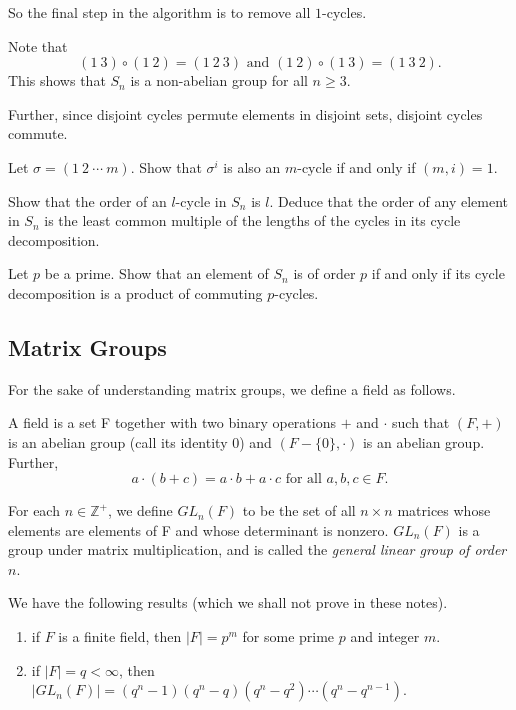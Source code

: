 So the final step in the algorithm is to remove all $1$-cycles.

\vspace{3mm}
Note that
$$(1\:3)\circ(1\:2)=(1\:2\:3)\text{ and }(1\:2)\circ(1\:3)=(1\:3\:2).$$
This shows that $S_n$ is a non-abelian group for all $n\geq 3$.

Further, since disjoint cycles permute elements in disjoint sets, disjoint cycles commute.

\begin{exercise}
    Let $\sigma=(1\:2\:\cdots\:m)$. Show that $\sigma^i$ is also an $m$-cycle if and only if $(m,i)=1$.
\end{exercise}
\begin{exercise}
    Show that the order of an $l$-cycle in $S_n$ is $l$. Deduce that the order of any element in $S_n$ is the least common multiple of the lengths of the cycles in its cycle decomposition.
\end{exercise}
\begin{exercise}
    Let $p$ be a prime. Show that an element of $S_n$ is of order $p$ if and only if its cycle decomposition is a product of commuting $p$-cycles.
\end{exercise}

\subsection{Matrix Groups}
For the sake of understanding matrix groups, we define a field as follows.

A field is a set F together with two binary operations $+$ and $\cdot$ such that $(F,+)$ is an abelian group (call its identity $0$) and $(F-\{0\},\cdot)$ is an abelian group. Further, $$a\cdot(b+c)=a\cdot b+a\cdot c\text{ for all $a,b,c\in F$}.$$

For each $n\in\mathbb{Z}^+$, we define $GL_n(F)$ to be the set of all $n\times n$ matrices whose elements are elements of F and whose determinant is nonzero. $GL_n(F)$ is a group under matrix multiplication, and is called the \textit{general linear group of order $n$}.

We have the following results (which we shall not prove in these notes).
\begin{enumerate}
    \item if $F$ is a finite field, then $|F|=p^m$ for some prime $p$ and integer $m$.
    \item if $|F|=q<\infty$, then $|GL_n(F)|=(q^n-1)(q^n-q)(q^n-q^2)\cdots(q^n-q^{n-1})$.
\end{enumerate}

